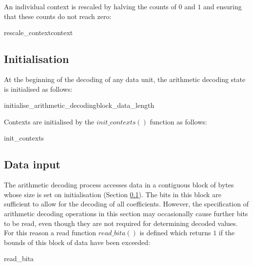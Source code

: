 An individual context is rescaled by halving the counts of $0$ and $1$ and ensuring that
these counts do not reach zero:

\begin{pseudo}{rescale\_context}{context}
\bsEND
\end{pseudo}

\subsection{Initialisation}
\label{initarith}

At the beginning of the decoding of any data unit, the arithmetic
decoding state is initialised as follows:

\begin{pseudo}{initialise\_arithmetic\_decoding}{block\_data\_length}
\end{pseudo}

Contexts are initialised by the $init\_contexts()$ function as follows:

\begin{pseudo}{init\_contexts}{}
\bsEND
\end{pseudo}

\subsection{Data input}
\label{inputarith}

The arithmetic decoding process accesses data in a contiguous block of bytes
whose size is set on initialisation (Section \ref{initarith}). The bits in this
block are sufficient to allow for the
decoding of all coefficients. However, the specification of arithmetic
decoding operations in this section may occasionally cause further bits to be read,
even though they are not required for determining decoded values. For this
reason a read function $read\_bita()$ is defined which returns $1$ if the
bounds of this block of data have been exceeded:

\begin{pseudo}{read\_bita}{}
\bsELSE
\bsEND
\end{pseudo}

